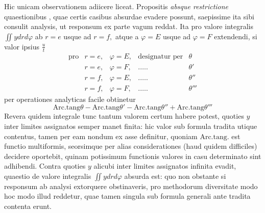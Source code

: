 \documentclass[14pt]{memoir}
\theoremstyle{plain}
\theoremstyle{remark}
\begin{document}
Hic unicam observationem adiicere liceat. Propositis \textit{absque restrictione} quaestionibus , quae certis casibus absurdae evadere possunt, saepissime ita sibi consulit analysis, ut responsum ex parte vagum reddat. Ita pro valore integralis \(\iint y dr d\varphi\) ab \(r=e\) usque ad \(r=f,\) atque a \(\varphi = E\) usque ad \(\varphi = F\) extendendi, si valor ipsius \(\tfrac{u}{t}\)
\[ \begin{array}{ccccc}
\text{pro} & r=e,& \varphi=E,& \text{designatur per} &\theta \\
& r=e,& \varphi=F,& .\dots. &\theta' \\
& r=f,& \varphi=E,& .\dots. &\theta'' \\
& r=f,& \varphi=F,& .\dots. &\theta''' \end{array} \]
per operationes analyticas facile obtinetur 
\[ \mathrm{Arc.tang }\theta - \mathrm{Arc.tang }\theta' -\mathrm{Arc.tang }\theta''+\mathrm{Arc.tang }\theta''' \]
Revera quidem integrale tunc tantum valorem certum habere potest, quoties \(y\) inter limites assignatos semper manet finita: hic valor sub formula tradita utique contentus, tamen per eam nondum ex asse definitur, quoniam \(\mathrm{Arc.tang.}\) est functio multiformis, seorsimque per alias considerationes (haud quidem difficiles) decidere oportebit, quinam potissimum functionis valores in casu determinato sint adhibendi. Contra quoties \(y\) alicubi inter limites assignatos infinita evadit, quaestio 
de valore integralis \(\iint y dr d\varphi\) absurda est: quo non obstante si responsum ab analysi extorquere obstinaveris, pro methodorum diversitate modo hoc modo illud reddetur, quae tamen singula sub formula generali ante tradita contenta erunt. 
\end{document}
